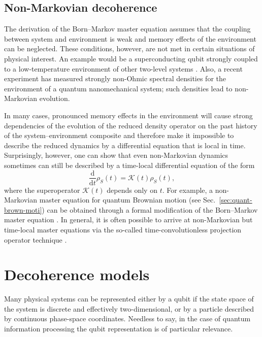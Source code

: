 \documentclass[aps,pra,reprint,amsmath,amssymb,showpacs,nofootinbib,floatfix,onecolumn,12pt]{revtex4-1}
\newcommand{\D}{\text{d}}
\begin{document}
\subsection{\label{sec:non-mark-decoh}Non-Markovian decoherence}

The derivation of the Born--Markov master equation assumes that the coupling between system and environment is weak and memory effects of the environment can be neglected. These conditions, however, are not met in certain situations of physical interest. An example would be a superconducting qubit strongly coupled to a low-temperature environment of other two-level systems \cite{Prokofev:2000:zz,Dube:2001:zz}. Also, a recent experiment \cite{Groeblacher:2013:im} has measured strongly non-Ohmic spectral densities for the environment of a quantum nanomechanical system; such densities lead to non-Markovian evolution. 

In many cases, pronounced memory effects in the environment will cause strong dependencies of the evolution of the reduced density operator on the past history of the system--environment composite and therefore make it impossible to describe the reduced dynamics by a differential equation that is local in time. Surprisingly, however, one can show that even non-Markovian dynamics sometimes can still be described by a time-local differential equation of the form
%
\begin{equation}
\label{eq:sfihvsfhv7}
  \frac{\D}{\D t} \rho_S(t) = \mathcal{K}(t) \rho_S(t),
\end{equation}
%
where the superoperator $\mathcal{K}(t)$ depends only on $t$. For example, a non-Markovian master equation for quantum Brownian motion (see Sec.~\ref{sec:quant-brown-moti}) can be obtained through a formal modification of the Born--Markov master equation \cite{Paz:2001:aa,Zurek:2002:ii}. In general, it is often possible to arrive at non-Markovian but time-local master equations via the so-called time-convolutionless projection operator technique \cite{Chaturvedi:1979:pm,Shibata:1980:ma,Royer:1972:um,Royer:2003:za}. 


\section{\label{sec:decmodels}Decoherence models}

Many physical systems can be represented either by a qubit if the state space of the system is
discrete and effectively two-dimensional, or by a particle described by continuous phase-space coordinates. Needless to say, in the case of quantum information processing the qubit representation is of particular relevance. 
\end{document}
